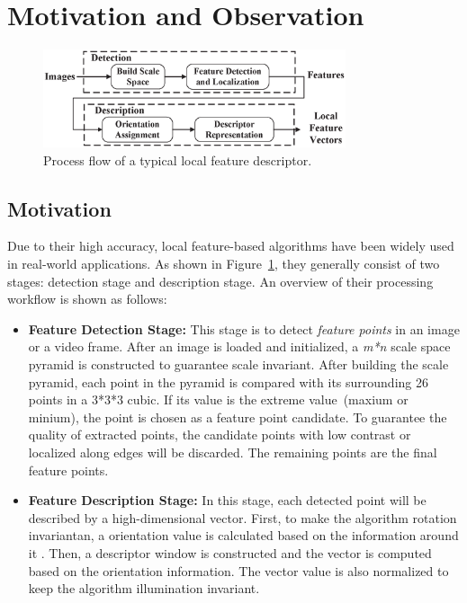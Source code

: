 \section{Motivation and Observation}
\label{sec:observation}

\begin{figure}
	\centering
	\includegraphics[width=3.5in]{images/fig-workflow.eps}
	\caption{Process flow of a typical local feature descriptor.}
	\label{fig:workflow}
\end{figure}

\subsection{Motivation}

Due to their high accuracy, local feature-based algorithms have been widely used in real-world applications.  As shown in Figure~\ref{fig:workflow}, they generally consist of two stages: detection stage and description stage.  An overview of their processing workflow is shown as follows:

\begin{itemize}
\setlength{\itemsep}{0mm}


\item \textbf{Feature Detection Stage:} This stage is to detect \emph{feature points} in an image or a video frame. After an image is loaded and initialized, a \emph{m*n} scale space pyramid is constructed to guarantee scale invariant.  After building the scale pyramid, each point in the pyramid is compared with its
surrounding 26 points in a 3*3*3 cubic. If its value is the extreme value~(maxium or minium), the point is chosen as a feature point candidate. To guarantee the quality of extracted points, the candidate points with low contrast or localized along edges will be discarded. The remaining points are the final feature points.

\item \textbf{Feature Description Stage:} In this stage, each detected point will be described by a high-dimensional vector. First, to make the algorithm rotation invariantan, a orientation value is calculated based on the information around it . Then, a descriptor window is constructed and the vector is computed based on the orientation information. The vector value is also normalized to keep the algorithm illumination invariant.
\end{itemize}


